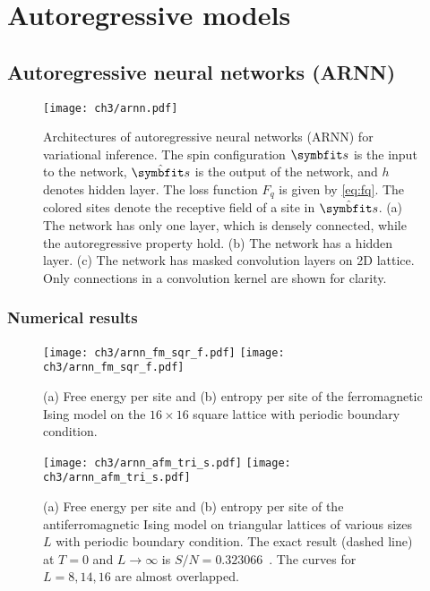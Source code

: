 \chapter{Autoregressive models}
\label{sec:arnn}

\section{Autoregressive neural networks (ARNN)}

\cite{wu2019solving}

\cite{nicoli2020asymptotically}

\cite{ciarella2023machine}

\begin{figure}[htb]
\centering
\texttt{[image: ch3/arnn.pdf]}
\caption[Architectures of autoregressive neural networks for variational inference]{
Architectures of autoregressive neural networks (ARNN) for variational inference.
The spin configuration $\vs$ is the input to the network, $\hat{\vs}$ is the output of the network, and $h$ denotes hidden layer. The loss function $F_q$ is given by \cref{eq:fq}. The colored sites denote the receptive field of a site in $\hat{\vs}$.
(a) The network has only one layer, which is densely connected, while the autoregressive property hold.
(b) The network has a hidden layer.
(c) The network has masked convolution layers on 2D lattice. Only connections in a convolution kernel are shown for clarity.
}
\label{fig:arnn}
\end{figure}

\subsection{Numerical results}

\begin{figure}[htb]
\centering
\texttt{[image: ch3/arnn\_fm\_sqr\_f.pdf]}
\texttt{[image: ch3/arnn\_fm\_sqr\_f.pdf]}
\caption[ARNN results of Ising model on square lattice]{
(a) Free energy per site and (b) entropy per site of the ferromagnetic Ising model on the $16 \times 16$ square lattice with periodic boundary condition.
}
\label{fig:arnn-sqr}
\end{figure}

\begin{figure}[htb]
\centering
\texttt{[image: ch3/arnn\_afm\_tri\_s.pdf]}
\texttt{[image: ch3/arnn\_afm\_tri\_s.pdf]}
\caption[ARNN results of Ising model on triangular lattice]{
(a) Free energy per site and (b) entropy per site of the antiferromagnetic Ising model on triangular lattices of various sizes $L$ with periodic boundary condition.
The exact result (dashed line) at $T = 0$ and $L \to \infty$ is $S / N = 0.323066$~\cite{TODO}. The curves for $L = 8, 14, 16$ are almost overlapped.
}
\label{fig:arnn-tri}
\end{figure}

